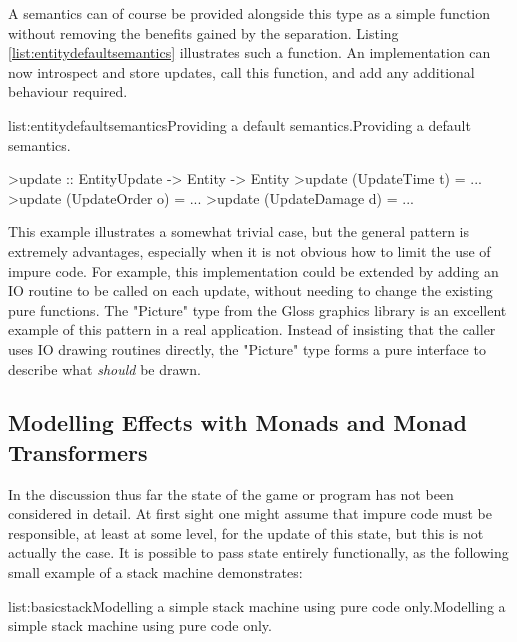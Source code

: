A semantics can of course be provided alongside this type as a simple function without removing the benefits gained by the separation. Listing \ref{list:entitydefaultsemantics} illustrates such a function. An implementation can now introspect and store updates, call this function, and add any additional behaviour required.

\vspace{-0.5em}
\begin{listing}{list:entitydefaultsemantics}{Providing a default semantics.}{Providing a default semantics.}{}
\end{listing}\vspace{-1.5em}

\begin{haskell}

>update :: EntityUpdate -> Entity -> Entity
>update (UpdateTime t) = ...
>update (UpdateOrder o) = ...
>update (UpdateDamage d) = ...

\end{haskell}
\noindent This example illustrates a somewhat trivial case, but the general pattern is extremely advantages, especially when it is not obvious how to limit the use of impure code. For example, this implementation could be extended by adding an IO routine to be called on each update, without needing to change the existing pure functions. 
The "Picture" type from the Gloss graphics library is an excellent example of this pattern in a real application. Instead of insisting that the caller uses IO drawing routines directly, the "Picture" type forms a pure interface to describe what \emph{should} be drawn.

\subsection{Modelling Effects with Monads and Monad Transformers}

In the discussion thus far the state of the game or program has not been considered in detail. At first sight one might assume that impure code must be responsible, at least at some level, for the update of this state, but this is not actually the case. It is possible to pass state entirely functionally, as the following small example of a stack machine demonstrates:

\vspace{-0.5em}
\begin{listing}{list:basicstack}{Modelling a simple stack machine using pure code only.}{Modelling a simple stack machine using pure code only.}{}
\end{listing}\vspace{-1.5em}

